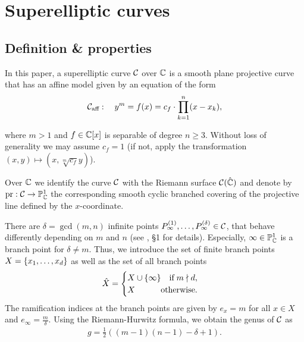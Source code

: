 \documentclass[main.tex]{subfiles}
\begin{document}
  \section{Superelliptic curves}\label{sec:se_curves}

  \subsection{Definition \& properties}\label{subsec:se_def}

    \begin{defn}\label{def:se_curve}
    In this paper, a superelliptic curve $\mathcal{C}$ over $\mathbb{C}$ is a smooth plane projective curve that has an affine model given by an equation of the form
   \begin{align}\label{eq:aff_model}
    \mathcal{C}_{\text{aff}} : \quad y^m = f(x) =  c_f \cdot \prod_{k=1}^n (x-x_k),
   \end{align}
   \end{defn}
   where $m > 1$ and $f \in \mathbb{C}[x]$ is separable of degree $n \ge 3$.
   Without loss of generality we may assume $c_f = 1$ (if not, apply the transformation $(x,y) \mapsto (x,\sqrt[m]{c_f}y)$).
   
   Over $\mathbb{C}$ we identify the curve $\mathcal{C}$ with the Riemann surface $\mathcal{C}(\hat{\mathbb{C}})$ and denote by $\operatorname{pr} : \mathcal{C} \rightarrow \mathbb{P}^1_{\mathbb{C}}$ the corresponding smooth cyclic branched covering of the projective line
   defined by the $x$-coordinate.

  There are $\delta = \gcd(m,n)$ infinite points $P_{\infty}^{(1)},\dots,P_{\infty}^{(\delta)} \in \mathcal{C}$, that behave differently depending on $m$ and $n$ (see \cite{CT1996}, \S 1 for details).
  Especially, $\infty \in \mathbb{P}^1_{\mathbb{C}}$ is a branch point for $\delta \ne m$. Thus, we introduce the set of finite branch points $X = \{ x_1,\dots,x_d \}$ as well as the set of all branch points
  \begin{align}\label{eq:branch_points}
         \hat{X} = \begin{cases}   X \cup \{ \infty \} \quad \text{if} \; m  \nmid  d,\\
         X \hfill \text{otherwise.}
     \end{cases}
  \end{align}
  The ramification indices at the branch points are given by $e_x = m$ for all $x \in X$ and $e_{\infty} = \frac{m}{\delta}$. Using the
  Riemann-Hurwitz formula, we obtain the genus of $\mathcal{C}$ as
  \begin{align}\label{eq:genus}
    g = \frac{1}{2}( (m-1)(n-1) - \delta + 1).
  \end{align}
\end{document}
